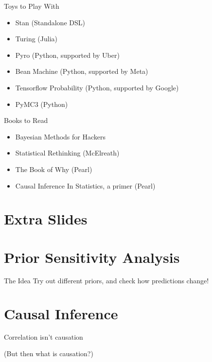 \documentclass[aspectratio=169,xcolor=svgnames]{beamer}
\begin{document}
\begin{frame}
  \begin{block}{Toys to Play With}
    \begin{itemize}
    \item Stan (Standalone DSL)
    \item Turing (Julia)
    \item Pyro (Python, supported by Uber)
    \item Bean Machine (Python, supported by Meta)
    \item Tensorflow Probability (Python, supported by Google)
    \item PyMC3 (Python)
    \end{itemize}
  \end{block}
\end{frame}

\begin{frame}
  \begin{block}{Books to Read}
  \begin{itemize}
  \item Bayesian Methods for Hackers
  \item Statistical Rethinking (McElreath)
  \item The Book of Why (Pearl)
  \item Causal Inference In Statistics, a primer (Pearl)
  \end{itemize}
  \end{block}
\end{frame}

\section{Extra Slides}

\section{Prior Sensitivity Analysis}

\begin{frame}{The Idea}
  \center
  Try out different priors, and check how predictions change!
\end{frame}

\section{Causal Inference}

\begin{frame}
  \center
  \huge
  Correlation isn't causation

  \footnotesize
  (But then what is causation?)
\end{frame}
\end{document}
